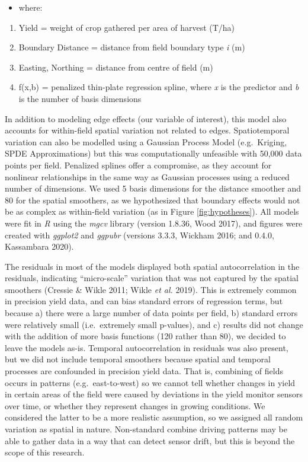 \documentclass[]{elsarticle} %
\providecommand{\tightlist}{%
  \setlength{\itemsep}{0pt}\setlength{\parskip}{0pt}}
\begin{document}
\begin{itemize}
\tightlist
\item
  where:
\end{itemize}

\begin{enumerate}
\def\labelenumi{\arabic{enumi}.}
\tightlist
\item
  Yield = weight of crop gathered per area of harvest (T/ha)
\item
  Boundary Distance = distance from field boundary type \emph{i} (m)
\item
  Easting, Northing = distance from centre of field (m)
\item
  f(x,b) = penalized thin-plate regression spline, where \emph{x} is the predictor and \emph{b} is the number of basis dimensions
\end{enumerate}

In addition to modeling edge effects (our variable of interest), this model also accounts for within-field spatial variation not related to edges.
Spatiotemporal variation can also be modelled using a Gaussian Process Model (e.g.~Kriging, SPDE Approximations) but this was computationally unfeasible with 50,000 data points per field.
Penalized splines offer a compromise, as they account for nonlinear relationships in the same way as Gaussian processes using a reduced number of dimensions.
We used 5 basis dimensions for the distance smoother and 80 for the spatial smoothers, as we hypothesized that boundary effects would not be as complex as within-field variation (as in Figure \ref{fig:hypotheses}).
All models were fit in \emph{R} using the \emph{mgcv} library (version 1.8.36, Wood 2017), and figures were created with \emph{ggplot2} and \emph{ggpubr} (versions 3.3.3, Wickham 2016; and 0.4.0, Kassambara 2020).

The residuals in most of the models displayed both spatial autocorrelation in the residuals, indicating ``micro-scale'' variation that was not captured by the spatial smoothers (Cressie \& Wikle 2011; Wikle \emph{et al.} 2019).
This is extremely common in precision yield data, and can bias standard errors of regression terms, but because a) there were a large number of data points per field, b) standard errors were relatively small (i.e.~extremely small p-values), and c) results did not change with the addition of more basis functions (120 rather than 80), we decided to leave the models as-is.
Temporal autocorrelation in residuals was also present, but we did not include temporal smoothers because spatial and temporal processes are confounded in precision yield data.
That is, combining of fields occurs in patterns (e.g.~east-to-west) so we cannot tell whether changes in yield in certain areas of the field were caused by deviations in the yield monitor sensors over time, or whether they represent changes in growing conditions.
We considered the latter to be a more realistic assumption, so we assigned all random variation as spatial in nature.
Non-standard combine driving patterns may be able to gather data in a way that can detect sensor drift, but this is beyond the scope of this research.
\end{document}

